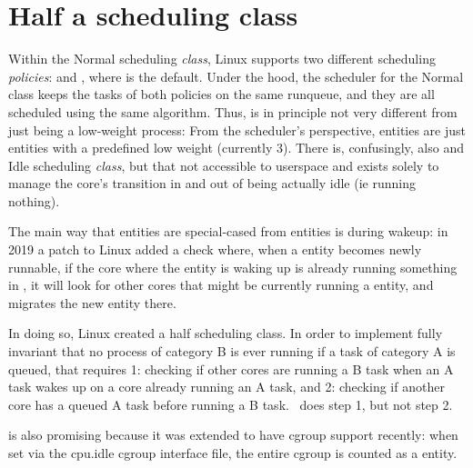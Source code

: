 
\section{Half a scheduling class}
\label{sec:sched-idle}

Within the Normal scheduling \textit{class}, Linux supports two different
scheduling \textit{policies}: \schednormal{} and \schedidle{}, where
\schednormal{} is the default. Under the hood, the scheduler for the Normal
class keeps the tasks of both policies on the same runqueue, and they are all
scheduled using the same algorithm. Thus, \schedidle{} is in principle not very
different from just being a low-weight process: From the scheduler's
perspective, \schedidle{} entities are just entities with a predefined low
weight (currently 3). There is, confusingly, also and Idle scheduling
\textit{class}, but that not accessible to userspace and exists solely to manage
the core's transition in and out of being actually idle (ie running nothing).

The main way that \schedidle{} entities are special-cased from \schednormal{}
entities is during wakeup: in 2019 a patch to Linux\cite{fixing-sched-idle-lwn}
added a check where, when a \schednormal{} entity becomes newly runnable, if the
core where the entity is waking up is already running something in
\schednormal{}, it will look for other cores that might be currently running a
\schedidle{} entity, and migrates the new entity there.

In doing so, Linux created a half scheduling class. In order to implement fully
invariant that no process of category B is ever running if a task of category A
is queued, that requires 1: checking if other cores are running a B task when an
A task wakes up on a core already running an A task, and 2: checking if another
core has a queued A task before running a B task.\ \schedidle{} does step 1, but
not step 2.

\schedidle{} is also promising because it was extended to have cgroup support
recently\cite{cgroup-idle-patch}: when set via the cpu.idle cgroup interface
file, the entire cgroup is counted as a \schedidle{} entity.

